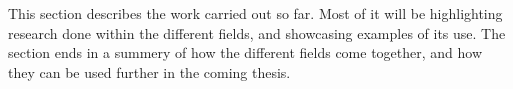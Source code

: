 \label{chap:Background Study}
This section describes the work carried out so far. Most of it will be highlighting research done within the different fields, and showcasing examples of its use. The section ends in a summery of how the different fields come together, and how they can be used further in the coming thesis. 





